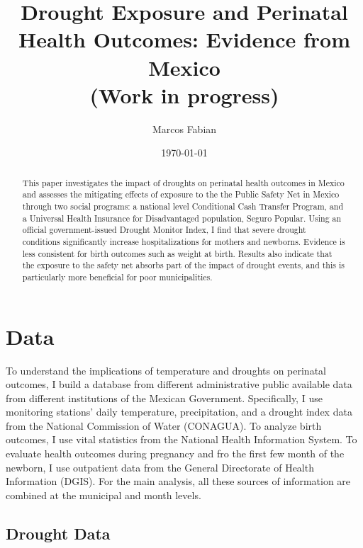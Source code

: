 \documentclass[12pt, oneside]{article}      %
\title{{Drought Exposure and Perinatal Health Outcomes: Evidence from Mexico} \vspace{1cm} \\ \large{(Work in progress)}}
\author{Marcos Fabian}
\date{\today}
\begin{document}
\maketitle



\begin{abstract}

This paper investigates the impact of droughts on perinatal health outcomes in Mexico and assesses the mitigating effects of exposure to the the Public Safety Net in Mexico through two social programs: a national level Conditional Cash Transfer Program, and a Universal Health Insurance for Disadvantaged population, Seguro Popular. Using an official government-issued Drought Monitor Index, I find that severe drought conditions significantly increase hospitalizations for mothers and newborns. Evidence is less consistent for birth outcomes such as weight at birth. Results also indicate that the exposure to the safety net absorbs part of the impact of drought events, and this is particularly more beneficial for poor municipalities.


\end{abstract}

\clearpage
\newpage




\section{Data}

To understand the implications of temperature and droughts on perinatal outcomes, I build a database from different administrative public available data from different institutions of the Mexican Government. Specifically, I use monitoring stations' daily temperature, precipitation, and a drought index data from the National Commission of Water (CONAGUA). To analyze birth outcomes, I use vital statistics from the National Health Information System. To evaluate health outcomes during pregnancy and fro the first few month of the newborn, I use outpatient data from the General Directorate of Health Information (DGIS). For the main analysis, all these sources of information are combined at the municipal and month levels. 

\subsection{Drought Data}
\end{document}
